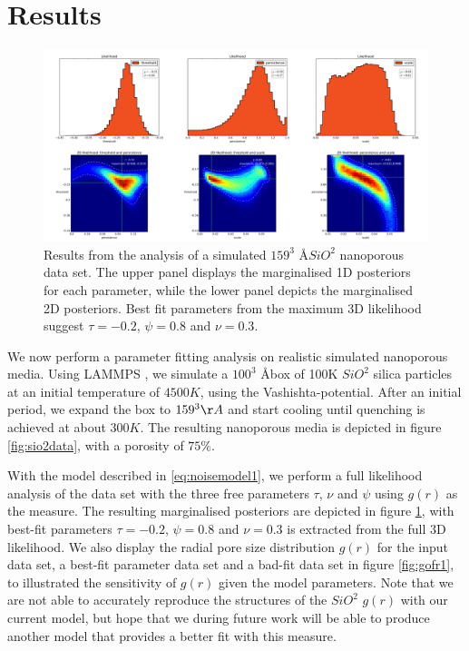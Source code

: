 \documentclass[aps,pre,twocolumn,letterpaper,floatfix,showpacs]{revtex4}
\begin{document}
\section{Results}
\begin{figure}
\includegraphics[width=.99\textwidth]{results_porous_full.png}
\caption{Results from the analysis of a simulated $159^3$ \AA $SiO^2$ nanoporous data set. The upper panel displays the marginalised 1D posteriors for each parameter, while the lower panel depicts the marginalised 2D posteriors. Best fit parameters from the maximum 3D likelihood suggest $\tau=-0.2$, $\psi=0.8$ and $\nu=0.3$.}
\label{fig:porous_results1}
\end{figure}

We now perform a parameter fitting analysis on realistic simulated nanoporous media. Using LAMMPS \cite{plimpton1995fast}, we simulate a $100^3$ \AA box of 100K $SiO^2$ silica particles at an initial temperature of $4500 K$, using the Vashishta-potential. After an initial period, we expand the box to $159^3 \AA$ and start cooling until quenching is achieved at about $300K$. The resulting nanoporous media is depicted in figure \ref{fig:sio2data}, with a porosity of $75\%$.

With the model described in \ref{eq:noisemodel1}, we perform a full likelihood analysis of the data set with the three free parameters $\tau$, $\nu$ and $\psi$ using $g(r)$ as the measure. The resulting marginalised posteriors are depicted in figure \ref{fig:porous_results1}, with best-fit parameters $\tau=-0.2$, $\psi=0.8$ and $\nu=0.3$ is extracted from the full 3D likelihood. We also display the radial pore size distribution $g(r)$ for the input data set, a best-fit parameter data set and a bad-fit data set in figure \ref{fig:gofr1}, to illustrated the sensitivity of $g(r)$ given the model parameters. Note that we are not able to accurately reproduce the structures of the $SiO^2$ $g(r)$ with our current model, but hope that we during future work will be able to produce another model that provides a better fit with this measure. 
\end{document}
